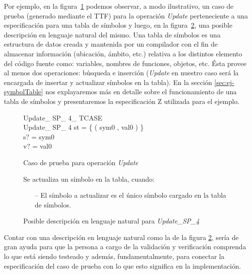 Por ejemplo, en la figura~\ref{fig:intro_tcl} podemos observar, a modo ilustrativo, un caso de prueba (generado mediante el TTF) para la operación \emph{Update} perteneciente a una especificación para una tabla de símbolos y luego, en la figura~\ref{fig:intro_tcl1}, una posible descripción en lenguaje natural del mismo. Una tabla de símbolos es una estructura de datos creada y mantenida por un compilador con el fin de almacenar información (ubicación, ámbito, etc.) relativa a los distintos elemento del código fuente como: variables, nombres de funciones, objetos, etc. Ésta provee al menos dos operaciones: búsqueda e inserción (\textit{Update} en nuestro caso será la encargada de insertar y actualizar símbolos en la tabla). En la sección \ref{sec:ej-symbolTable} nos explayaremos más en detalle sobre el funcionamiento de una tabla de símbolos y presentaremos la especificación Z utilizada para el ejemplo.

\begin{figure}[H]
	\centering
  \begin{schema}{Update\_ SP\_ 4\_ TCASE}\\
   Update\_ SP\_ 4 
  \where
   st = \{ ( sym0 , val0 ) \} \\
   s? = sym0 \\
   v? = val0
 \end{schema}
 \caption{Caso de prueba para operación \emph{Update}}
  \label{fig:intro_tcl}
\end{figure}
 
\begin{figure}[H]
 \begin{tcolorbox}[colback=gray!5!white,colframe=gray!50!black,
  colbacktitle=gray!75!black,title=Update\_SP\_4]
  Se actualiza un símbolo en la tabla, cuando:
     \begin{itemize}
  	    \item[--]{El símbolo a actualizar es el único símbolo cargado en la tabla de símbolos.}
     \end{itemize}
 \end{tcolorbox}
 \caption{Posible descripción en lenguaje natural para \emph{Update\_SP\_4}}
 \label{fig:intro_tcl1}
\end{figure}

Contar con una descripción en lenguaje natural como la de la figura \ref{fig:intro_tcl1}, sería de gran ayuda para que la persona a cargo de la validación y verificación comprenda lo que está siendo testeado y además, fundamentalmente, para conectar la especificación del caso de prueba con lo que esto significa en la implementación.


